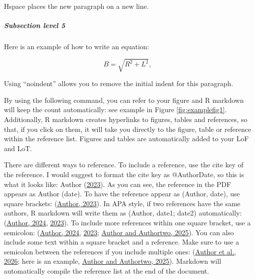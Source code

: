 \documentclass[
]{article}
\begin{document}
\hspace{-2.5em}

Hspace places the new paragraph on a new line.

\hypertarget{subsection-level-5}{%
\subparagraph{Subsection level 5}\label{subsection-level-5}}

\hspace{-2.5em}

Here is an example of how to write an equation:

\begin{equation}
\label{eq:example}
B = \sqrt{R^2+L^2},
\end{equation}

\noindent Using ``noindent'' allows you to remove the initial indent for this paragraph.

By using the following command, you can refer to your figure and R markdown will keep the count automatically: see example in Figure \ref{fig:examplefig1}. Additionally, R markdown creates hyperlinks to figures, tables and references, so that, if you click on them, it will take you directly to the figure, table or reference within the reference list. Figures and tables are automatically added to your LoF and LoT.

There are different ways to reference. To include a reference, use the cite key of the reference. I would suggest to format the cite key as @AuthorDate, so this is what it looks like: Author (\protect\hyperlink{ref-Author2023}{2023}). As you can see, the reference in the PDF appears as Author (date). To have the reference appear as (Author, date), use square brackets: (\protect\hyperlink{ref-Author2023}{Author, 2023}). In APA style, if two references have the same authors, R markdown will write them as (Author, date1; date2) automatically: (\protect\hyperlink{ref-Author2024}{Author, 2024}, \protect\hyperlink{ref-Author2023}{2023}). To include more references within one square bracket, use a semicolon: (\protect\hyperlink{ref-Author2024}{Author, 2024}, \protect\hyperlink{ref-Author2023}{2023}; \protect\hyperlink{ref-Author2025}{Author and Authortwo, 2025}). You can also include some text within a square bracket and a reference. Make sure to use a semicolon between the references if you include multiple ones: (\protect\hyperlink{ref-Author2026}{Author et al., 2026}; here is an example, \protect\hyperlink{ref-Author2025}{Author and Authortwo, 2025}). Markdown will automatically compile the reference list at the end of the document.
\end{document}
